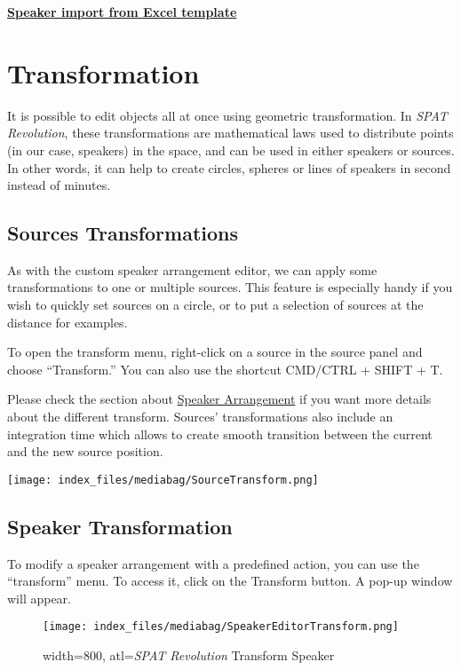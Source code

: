 \documentclass[
  letterpaper,
  DIV=11,
  numbers=noendperiod]{scrreport}
\begin{document}
\textbf{\href{https://public.3.basecamp.com/p/w1VQL9UbbndSXP5P3qpU6DnU}{Speaker
import from Excel template}}

\hypertarget{transformation}{%
\chapter{Transformation}\label{transformation}}

It is possible to edit objects all at once using geometric
transformation. In \emph{SPAT Revolution}, these transformations are
mathematical laws used to distribute points (in our case, speakers) in
the space, and can be used in either speakers or sources. In other
words, it can help to create circles, spheres or lines of speakers in
second instead of minutes.

\hypertarget{sources-transformations}{%
\section{Sources Transformations}\label{sources-transformations}}

As with the custom speaker arrangement editor, we can apply some
transformations to one or multiple sources. This feature is especially
handy if you wish to quickly set sources on a circle, or to put a
selection of sources at the distance for examples.

To open the transform menu, right-click on a source in the source panel
and choose ``Transform.'' You can also use the shortcut CMD/CTRL + SHIFT
+ T.

Please check the section about
\href{Spatialisation_Technology_Speaker_Arrangement.md}{Speaker
Arrangement} if you want more details about the different transform.
Sources' transformations also include an integration time which allows
to create smooth transition between the current and the new source
position.

\texttt{[image: index\_files/mediabag/SourceTransform.png]}

\hypertarget{speaker-transformation}{%
\section{Speaker Transformation}\label{speaker-transformation}}

To modify a speaker arrangement with a predefined action, you can use
the ``transform'' menu. To access it, click on the Transform button. A
pop-up window will appear.

\begin{figure}

{\centering \texttt{[image: index\_files/mediabag/SpeakerEditorTransform.png]}

}

\caption{width=800, atl=\emph{SPAT Revolution} Transform Speaker}

\end{figure}
\end{document}
